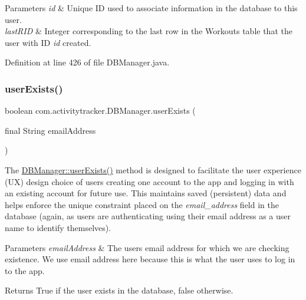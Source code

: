 \begin{DoxyParams}{Parameters}
{\em id} & Unique ID used to associate information in the database to this user. \\
\hline
{\em last\+R\+ID} & Integer corresponding to the last row in the Workouts table that the user with ID {\itshape id} created. \\
\hline
\end{DoxyParams}


Definition at line 426 of file D\+B\+Manager.\+java.

\mbox{\label{classcom_1_1activitytracker_1_1_d_b_manager_af05d79f33ecf2920a67d1b9cf82c079f}} 
\subsubsection{\texorpdfstring{user\+Exists()}{userExists()}}
{\footnotesize\ttfamily boolean com.\+activitytracker.\+D\+B\+Manager.\+user\+Exists (\begin{DoxyParamCaption}\item[{final String}]{email\+Address }\end{DoxyParamCaption})}

The \mbox{\hyperlink{classcom_1_1activitytracker_1_1_d_b_manager_af05d79f33ecf2920a67d1b9cf82c079f}{D\+B\+Manager\+::user\+Exists()}} method is designed to facilitate the user experience (UX) design choice of users creating one account to the app and logging in with an existing account for future use. This maintains saved (persistent) data and helps enforce the unique constraint placed on the {\itshape email\+\_\+address} field in the database (again, as users are authenticating using their email address as a user name to identify themselves).


\begin{DoxyParams}{Parameters}
{\em email\+Address} & The user\textquotesingle{}s email address for which we are checking existence. We use email address here because this is what the user uses to log in to the app. \\
\hline
\end{DoxyParams}
\begin{DoxyReturn}{Returns}
True if the user exists in the database, false otherwise. 
\end{DoxyReturn}


